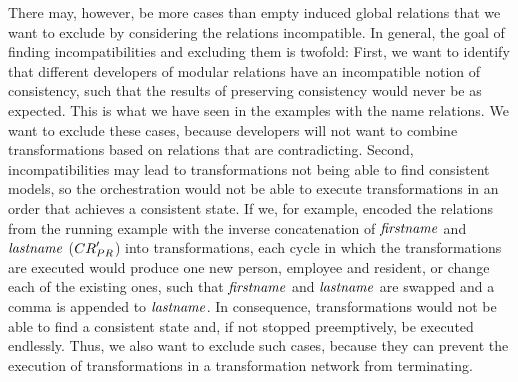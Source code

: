There may, however, be more cases than empty induced global relations that we want to exclude by considering the relations incompatible.
In general, the goal of finding incompatibilities and excluding them is twofold:
First, we want to identify that different developers of modular relations have an incompatible notion of consistency, such that the results of preserving consistency would never be as expected.
This is what we have seen in the examples with the name relations.
We want to exclude these cases, because developers will not want to combine transformations based on relations that are contradicting.
Second, incompatibilities may lead to transformations not being able to find consistent models, so the orchestration would not be able to execute transformations in an order that achieves a consistent state.
If we, for example, encoded the relations from the running example with the inverse concatenation of $\mathit{firstname}$ and $\mathit{lastname}$ ($\consistencyrelation{CR}{PR}'$) into transformations, each cycle in which the transformations are executed would produce one new person, employee and resident, or change each of the existing ones, such that $\mathit{firstname}$ and $\mathit{lastname}$ are swapped and a comma is appended to $\mathit{lastname}$.
In consequence, transformations would not be able to find a consistent state and, if not stopped preemptively, be executed endlessly.
Thus, we also want to exclude such cases, because they can prevent the execution of transformations in a transformation network from terminating.

